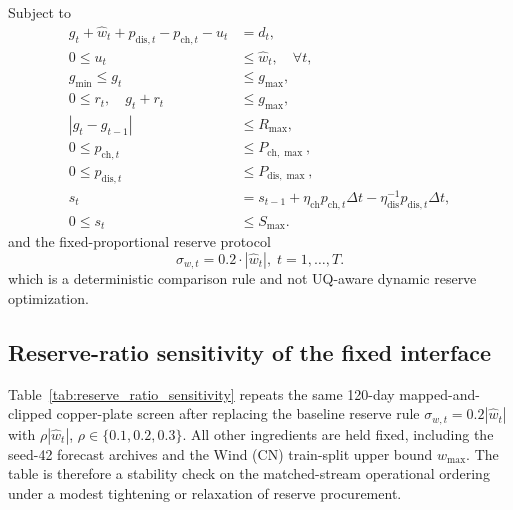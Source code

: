 \documentclass[review,1p,times]{elsarticle}
\begin{document}
Subject to
\begin{align}
g_t + \hat{w}_t + p_{\text{dis},t} - p_{\text{ch},t} - u_t &= d_t, \label{eq:app_dispatch_balance}\\
0\le u_t &\le \hat{w}_t,\quad \forall t, \nonumber\\
g_{\min}\le g_t &\le g_{\max}, \label{eq:app_dispatch_gen}\\
0\le r_t, \quad g_t+r_t &\le g_{\max}, \nonumber\\
|g_t-g_{t-1}| &\le R_{\max}, \nonumber\\
0\le p_{\text{ch},t} &\le P_{\text{ch},\max}, \label{eq:app_dispatch_storage_power}\\
0\le p_{\text{dis},t} &\le P_{\text{dis},\max}, \nonumber\\
s_t &= s_{t-1} + \eta_{\text{ch}}p_{\text{ch},t}\Delta t - \eta_{\text{dis}}^{-1}p_{\text{dis},t}\Delta t, \label{eq:app_dispatch_storage_soc}\\
0\le s_t &\le S_{\max}. \nonumber
\end{align}
and the fixed-proportional reserve protocol
\begin{equation}
\sigma_{w,t}=0.2\cdot|\hat{w}_t|,\; t=1,\ldots,T.
\end{equation}
which is a deterministic comparison rule and not UQ-aware dynamic reserve optimization.

\subsection{Reserve-ratio sensitivity of the fixed interface}
\label{subsec:reserve_ratio_sensitivity}
Table~\ref{tab:reserve_ratio_sensitivity} repeats the same 120-day mapped-and-clipped copper-plate screen after replacing the baseline reserve rule $\sigma_{w,t}=0.2|\hat{w}_t|$ with $\rho|\hat{w}_t|$, $\rho\in\{0.1,0.2,0.3\}$. All other ingredients are held fixed, including the seed-42 forecast archives and the Wind (CN) train-split upper bound $w_{\max}$. The table is therefore a stability check on the matched-stream operational ordering under a modest tightening or relaxation of reserve procurement.
\end{document}
